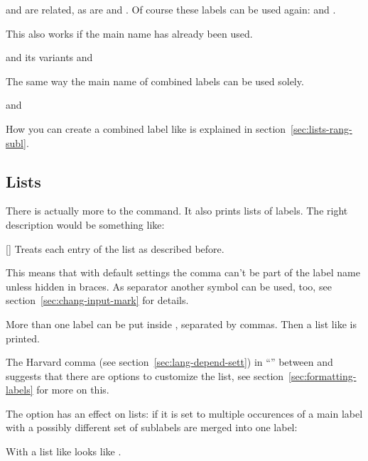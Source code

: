 \documentclass[load-preamble+,ngerman,british,american]{cnltx-doc}
\begin{document}
\begin{example}
   and  are related, as are  and
  .  Of course these labels can be used again:  and
  .
\end{example}

This also works if the main name has already been used.
\begin{example}
   and its variants  and 
\end{example}

The same way the main name of combined labels can be used solely.
\begin{example}
   and 
\end{example}

How you can create a combined label like  is explained in
section~\ref{sec:lists-rang-subl}.

\subsection{Lists}\label{sec:lists}
There is actually more to the  command.  It also prints lists of
labels.  The right description would be something like:
\begin{commands}
  []
    Treats each entry of the list as described before.
\end{commands}
This means that with default settings the comma can't be part of the label
name unless hidden in braces.  As separator another symbol can be used, too,
see section~\ref{sec:chang-input-mark} for details.

\begin{example}
  More than one label can be put inside , separated by commas.  Then
  a list like  is printed.
\end{example}
The Harvard comma (see section~\ref{sec:lang-depend-sett}) in \enquote{}
between  and  suggests that there are options to customize
the list, see section~\ref{sec:formatting-labels} for more on this.

The option  has an effect on lists: if it is set to 
multiple occurences of a main label with a possibly different set of sublabels
are merged into one label:

\begin{example}
  With  a list like  looks
  like .
\end{example}
\end{document}
